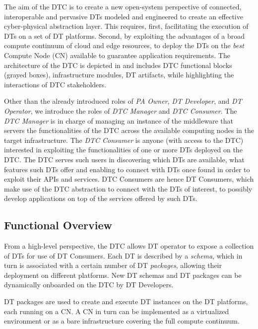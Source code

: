 The aim of the DTC is to create a new open-system perspective of connected, interoperable and pervasive DTs modeled and engineered to create an effective cyber-physical abstraction layer.
%
This requires, first, facilitating the execution of DTs on a set of DT platforms.
Second, by exploiting the advantages of a broad compute continuum of cloud and edge resources, to deploy the DTs on the \textit{best} Compute Node (CN) available to guarantee application requirements.
%
The architecture of the DTC is depicted in  and includes DTC functional blocks (grayed boxes), infrastructure modules, DT artifacts, while highlighting the interactions of DTC stakeholders. 

Other than the already introduced roles of \emph{PA Owner}, \emph{DT Developer}, and \emph{DT Operator}, we introduce the roles of \emph{DTC Manager} and \emph{DTC Consumer}.
%
The \emph{DTC Manager} is in charge of managing an instance of the middleware that servers the functionalities of the DTC across the available computing nodes in the target infrastructure.
%
The \emph{DTC Consumer} is anyone (with access to the DTC) interested in exploiting the functionalities of one or more \acp{DT} deployed on the DTC.
%
The DTC serves such users in discovering which \acp{DT} are available, what features such \acp{DT} offer and enabling to connect with \acp{DT} once found in order to exploit their APIs and services. DTC Consumers are hence DT Consumers, which make use of the DTC abstraction to connect with the \acp{DT} of interest, to possibly develop applications on top of the services offered by such \acp{DT}. 

\subsection{Functional Overview}

From a high-level perspective, the DTC allows DT operator to expose a collection of DTs for use of DT Consumers.
%
Each DT is described by a \emph{schema}, which in turn is associated with a certain number of DT \emph{packages}, allowing their deployment on different platforms.
%
New DT schemas and DT packages can be dynamically onboarded on the DTC by DT Developers.

DT packages are used to create and execute DT instances on the DT platforms, each running on a CN. A CN in turn can be implemented as a virtualized environment or as a bare infrastructure covering the full compute continuum. 


